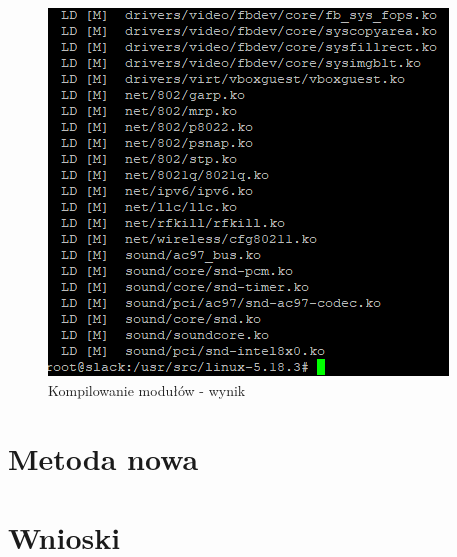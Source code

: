\documentclass[a4paper,12pt,oneside]{book} %
\begin{document}
\begin{figure}[h]
	\centering
	\includegraphics[scale=0.6]{11-modules-comp}
	\caption{Kompilowanie modułów - wynik}
	\label{modules-comp}
\end{figure}



\chapter{Metoda nowa}
\label{Metoda nowa}

\chapter{Wnioski}
\label{Wnioski}



\end{document}
